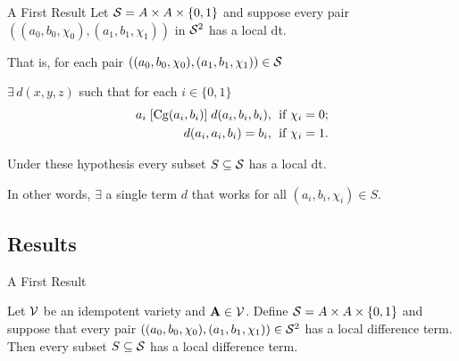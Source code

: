 \documentclass[notes=hide,12pt,xcolor=dvipsnames%
   ]{beamer}
\newcommand{\bigpause}{\pause\bigskip}
\newcommand{\medpause}{\pause\medskip}
\begin{document}
\begin{frame}[label=local-diff-term-res,shrink]{A First Result}
  Let 
  $\mathcal{S} = A \times A \times \{0,1\}$ and
  suppose every pair
  $((a_0, b_0, \chi_0), (a_1, b_1, \chi_1))$
  in $\mathcal{S}^2$ has a local dt.

  \bigpause
  That is, for each pair $((a_0, b_0, \chi_0), (a_1, b_1, \chi_1)) \in \mathcal{S}$ 

  $\exists \, d(x,y,z)$ such that for each $i \in \{0,1\}$
  \begin{align}
    a_i \Comr{\Cg(a_i,b_i)} d(a_i,b_i,b_i), & \;
  \text{ if $\chi_i=0$;}  \label{eq:d-trip-i1}\\
  d(a_i,a_i,b_i) =b_i, & \;
  \text{ if $\chi_i=1$.}\label{eq:d-trip-i2} %
  \end{align}
  
  \medpause
  Under these hypothesis every subset $S\subseteq \mathcal{S}$
  has a local dt.

  \vskip1mm
  In other words, $\exists$ a single term $d$ that works 
  for all $(a_i, b_i, \chi_i) \in S$.
\end{frame}

\subsection{Results}

\begin{frame}[label=local-diff-term-res]{A First Result}

\begin{theorem}[1] %
  \label{thm:local-diff-terms}
  Let $\mathcal{V}$ be an idempotent variety and
  $\mathbf{A} \in \mathcal{V}$. Define
  $\mathcal{S}= A \times A \times \{0,1\}$
  and suppose that every pair
  $((a_0, b_0, \chi_0), (a_1, b_1, \chi_1)) \in \mathcal{S}^2$
  has a local difference term.
  Then every subset $S \subseteq \mathcal{S}$
  has a local difference term.
\end{theorem}

\end{frame}
\end{document}
